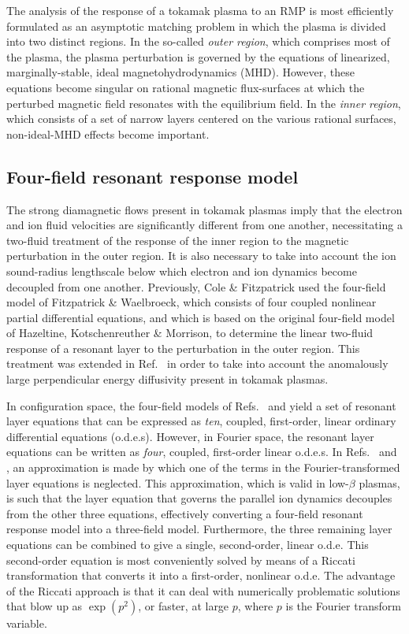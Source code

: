 \documentclass[12pt,prb,aps]{revtex4-1}
\begin{document}
The analysis  of the response of a tokamak plasma to an RMP  is most efficiently formulated as an asymptotic matching problem in which the  plasma is  divided into two distinct regions.\cite{fkr}    In the so-called {\em outer region}, which comprises most
of the plasma, the plasma perturbation is governed by the equations of linearized, marginally-stable, ideal magnetohydrodynamics (MHD).
However, these equations become singular on    rational  magnetic flux-surfaces at which the perturbed magnetic field resonates with the equilibrium field. In the {\em inner region}, which
consists of a set of narrow layers centered on the various rational surfaces, non-ideal-MHD effects   become important.

\subsection{Four-field resonant response model}
 The strong  diamagnetic flows present in tokamak plasmas imply that the  electron and ion fluid velocities are significantly different from one another,
necessitating a two-fluid treatment of the response of the inner region to the magnetic perturbation in the outer region.\cite{ara} It is also necessary to  take  into account the   ion sound-radius lengthscale below which electron and ion dynamics become decoupled from one another.\cite{drake,wal} Previously, Cole \& Fitzpatrick\cite{cole} used the four-field model
of Fitzpatrick \& Waelbroeck,\cite{fw} which consists of four coupled nonlinear partial differential equations,
and which is based on the original four-field model of Hazeltine, Kotschenreuther \& Morrison, \cite{haz} 
to determine the linear two-fluid response of a resonant layer to the perturbation in the outer region. This treatment was extended in Ref.~ in order  to take into account the
 anomalously large perpendicular  energy diffusivity  present in tokamak plasmas. 
 
 In configuration space, the four-field models of Refs.~ and  yield a set of resonant layer equations that can be expressed as 
 {\em ten},   coupled,
 first-order, linear ordinary differential equations (o.d.e.s).\cite{lee} However, in Fourier space, the resonant layer equations can be written as 
 {\em four}, coupled,  first-order linear o.d.e.s.\cite{cole} In Refs.~
 and , an approximation is made by which one of the terms in the Fourier-transformed layer equations is neglected. This
 approximation, which is valid in low-$\beta$ plasmas,  is such that the layer equation that governs the parallel ion dynamics decouples from the other three equations, effectively
 converting a four-field resonant response model into a three-field model. Furthermore, the three remaining layer equations can be combined to give a
 single, second-order, linear o.d.e. This second-order equation is most conveniently solved  by means of a Riccati transformation
 that converts it into a first-order, nonlinear o.d.e.\cite{ric1,ric2,ric3} The advantage of the Riccati approach is that it can deal with numerically problematic  solutions
 that blow up as $\exp(p^2)$, or faster, at large $p$, where $p$ is the Fourier transform variable. 
 
\end{document}

